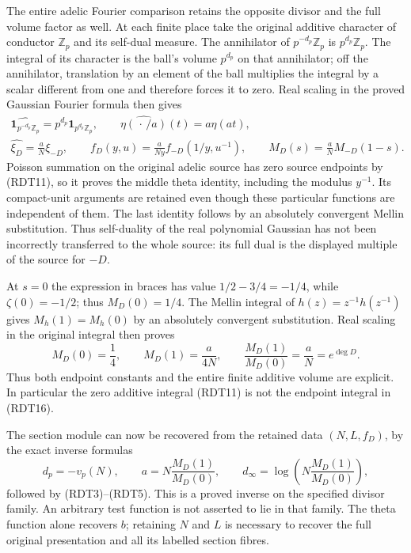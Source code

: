 The entire adelic Fourier comparison retains the opposite divisor and
the full volume factor as well. At each finite place take the original
additive character of conductor $\mathbb Z_p$ and its self-dual
measure. The annihilator of $p^{-d_p}\mathbb Z_p$ is
$p^{d_p}\mathbb Z_p$. The integral of its character is the ball's
volume $p^{d_p}$ on that annihilator; off the annihilator, translation
by an element of the ball multiplies the integral by a scalar
different from one and therefore forces it to zero. Real scaling in
the proved Gaussian Fourier formula then gives
\begin{equation}\tag{RDT15a}
\begin{gathered}
\widehat{\mathbf1_{p^{-d_p}\mathbb Z_p}}
=p^{d_p}\mathbf1_{p^{d_p}\mathbb Z_p},\qquad
\widehat{\eta(\,\cdot\,/a)}(t)=a\eta(at),\\
\widehat{\xi_D}=\frac aN\xi_{-D},\qquad
f_D(y,u)=\frac{a}{Ny}f_{-D}(1/y,u^{-1}),\qquad
M_D(s)=\frac aN M_{-D}(1-s).
\end{gathered}
\end{equation}
Poisson summation on the original adelic source has zero source
endpoints by (RDT11), so it proves the middle theta identity,
including the modulus $y^{-1}$. Its compact-unit arguments are
retained even though these particular functions are independent of
them. The last identity follows by an absolutely convergent Mellin
substitution. Thus self-duality of the real polynomial Gaussian has
not been incorrectly transferred to the whole source: its full dual
is the displayed multiple of the source for $-D$.

At $s=0$ the expression in braces has value
$1/2-3/4=-1/4$, while $\zeta(0)=-1/2$; thus $M_D(0)=1/4$.
The Mellin integral of $h(z)=z^{-1}h(z^{-1})$ gives $M_h(1)=M_h(0)$
by an absolutely convergent substitution. Real scaling in the original
integral then proves
\begin{equation}\tag{RDT16}
M_D(0)=\frac14,\qquad M_D(1)=\frac{a}{4N},\qquad
\frac{M_D(1)}{M_D(0)}=\frac aN=e^{\deg D}.
\end{equation}
Thus both endpoint constants and the entire finite additive volume
are explicit. In particular the zero additive integral (RDT11) is
not the endpoint integral in (RDT16).

The section module can now be recovered from the retained data
$(N,L,f_D)$, by the exact inverse formulas
\begin{equation}\tag{RDT17}
d_p=-v_p(N),\qquad
a=N\frac{M_D(1)}{M_D(0)},\qquad
d_\infty=\log\left(N\frac{M_D(1)}{M_D(0)}\right),
\end{equation}
followed by (RDT3)--(RDT5). This is a proved inverse on the specified
divisor family. An arbitrary test function is not asserted to lie in
that family. The theta function alone recovers $b$; retaining $N$
and $L$ is necessary to recover the full original presentation and
all its labelled section fibres.

